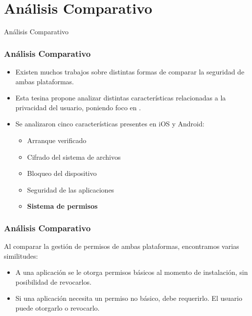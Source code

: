 \section{Análisis Comparativo}
\begin{frame}
 \begin{center}
  \LARGE Análisis Comparativo
 \end{center}
\end{frame}
\begin{frame}
 \frametitle{Análisis Comparativo}
 \begin{itemize}
  \item Existen muchos trabajos sobre distintas formas de comparar la seguridad de ambas plataformas.\pause
  \item Esta tesina propone analizar distintas características relacionadas a la privacidad del usuario, \pause poniendo foco en .\pause
  \item Se analizaron cinco características presentes en iOS y Android:\pause
     \begin{itemize}[<+->]
      \item Arranque verificado
      \item Cifrado del sistema de archivos
      \item Bloqueo del dispositivo
      \item Seguridad de las aplicaciones
      \item \textbf{Sistema de permisos}
     \end{itemize}
 \end{itemize}
\end{frame}
\begin{frame}
 \frametitle{Análisis Comparativo}
Al comparar la gestión de permisos de ambas plataformas, encontramos varias similitudes:\pause
 \begin{itemize}[<+->]
  \item A una aplicación se le otorga permisos básicos al momento de instalación, sin posibilidad de revocarlos.
  \item Si una aplicación necesita un permiso no básico, debe requerirlo. El usuario puede otorgarlo o revocarlo.
 \end{itemize}
\end{frame}
